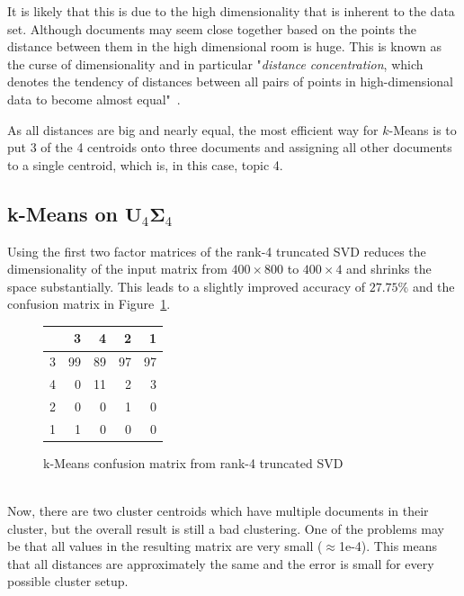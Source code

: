 \documentclass{support/acm_proc_article-sp}
\begin{document}
    It is likely that this is due to the high dimensionality that is inherent to the data set.
    Although documents may seem close together based on the points the distance between them in the high dimensional
    room is huge.
    This is known as the curse of dimensionality and in particular "\emph{distance concentration}, which denotes
    the tendency of distances between all pairs of points in high-dimensional data to become almost
    equal"~\cite[p.1]{Radovanovic:2010}.

    As all distances are big and nearly equal, the most efficient way for $k$-Means is to put 3 of the 4 centroids onto
    three documents and assigning all other documents to a single centroid, which is, in this case, topic 4.


    \subsection{k-Means on $\mathbf{U}_4\mathbf{\Sigma}_4$}
    \label{subsec:k-means-svd}

    Using the first two factor matrices of the rank-4 truncated SVD reduces the dimensionality of the input matrix
    from $400 \times 800$ to $400 \times 4$ and shrinks the space substantially.
    This leads to a slightly improved accuracy of $27.75\%$ and the confusion matrix in Figure~\ref{tab:k-means-svd}.
    \begin{figure}[htbp]
        \begin{center}
            \begin{tabular}{r | r r r r}
                & 3 & 4 & 2 & 1 \\
                \hline
                3 & 99 & 89 & 97 & 97 \\
                4 & 0 & 11 & 2 & 3 \\
                2 & 0 & 0 & 1 & 0 \\
                1 & 1 & 0 & 0 & 0
            \end{tabular}
        \end{center}
        \caption{k-Means confusion matrix from rank-4 truncated SVD}
        \label{tab:k-means-svd}
    \end{figure} \\
    Now, there are two cluster centroids which have multiple documents in their cluster, but the overall result is still
    a bad clustering.
    One of the problems may be that all values in the resulting matrix are very small ($\approx$1e-4).
    This means that all distances are approximately the same and the error is small for every possible cluster
    setup.
\end{document}
